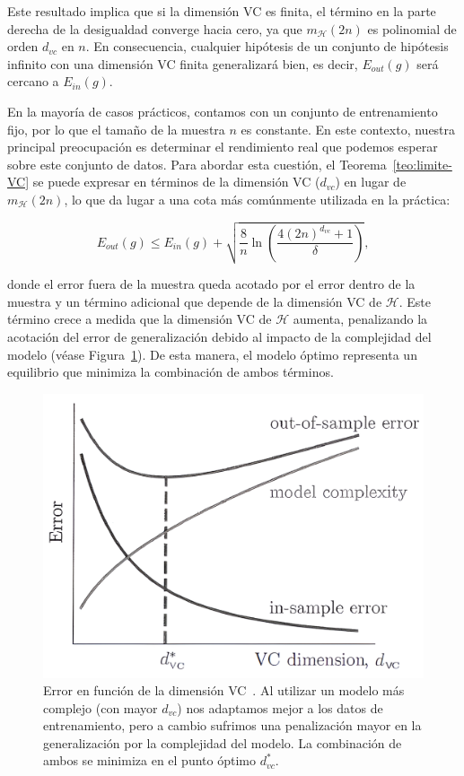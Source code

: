 Este resultado implica que si la dimensión VC es finita, el término en la parte derecha de la desigualdad converge hacia cero, ya que $m_{\mathcal{H}}(2n)$ es polinomial de orden $d_{vc}$ en $n$. En consecuencia, cualquier hipótesis de un conjunto de hipótesis infinito con una dimensión VC finita generalizará bien, es decir, $E_{out}(g)$ será cercano a $E_{in}(g)$.

En la mayoría de casos prácticos, contamos con un conjunto de entrenamiento fijo, por lo que el tamaño de la muestra $n$ es constante. En este contexto, nuestra principal preocupación es determinar el rendimiento real que podemos esperar sobre este conjunto de datos. Para abordar esta cuestión, el Teorema~\ref{teo:limite-VC} se puede expresar en términos de la dimensión VC ($d_{vc}$) en lugar de $m_{\mathcal{H}}(2n)$, lo que da lugar a una cota más comúnmente utilizada en la práctica:

\[
    E_{out}(g) \leq E_{in}(g) + \sqrt{\frac{8}{n} \ln \left( \frac{4 (2n)^{d_{vc}} + 1}{\delta} \right) },
\]

donde el error fuera de la muestra queda acotado por el error dentro de la muestra y un término adicional que depende de la dimensión VC de $\mathcal{H}$. Este término crece a medida que la dimensión VC de $\mathcal{H}$ aumenta, penalizando la acotación del error de generalización debido al impacto de la complejidad del modelo (véase Figura~\ref{fig:vcdimension}). De esta manera, el modelo óptimo representa un equilibrio que minimiza la combinación de ambos términos.

\begin{figure}[h]
    \centering
    \includegraphics[width=0.5\linewidth]{img/vc-dimension.png}
    \caption[Error en función de la dimensión VC~\cite{Mostafa2012}.] {Error en función de la dimensión VC~\cite{Mostafa2012}. Al utilizar un modelo más complejo (con mayor $d_{vc}$) nos adaptamos mejor a los datos de entrenamiento, pero a cambio sufrimos una penalización mayor en la generalización por la complejidad del modelo. La combinación de ambos se minimiza en el punto óptimo $d_{vc}^{*}$.}\label{fig:vcdimension}
\end{figure}

